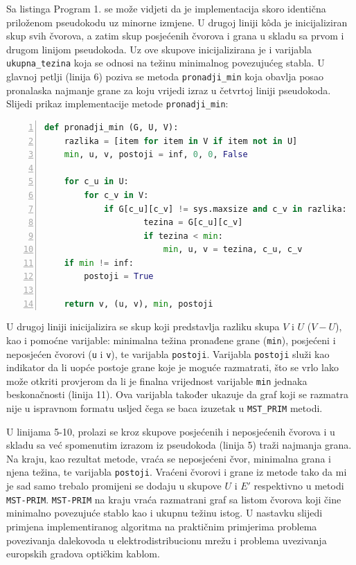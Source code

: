 \documentclass[conference]{IEEEtran}
\begin{document}
Sa listinga Program 1. se može vidjeti da je implementacija skoro identična priloženom pseudokodu uz minorne izmjene. U drugoj liniji kôda je inicijaliziran skup svih čvorova, a zatim skup posjećenih čvorova i grana u skladu sa prvom i drugom linijom pseudokoda. Uz ove skupove inicijalizirana je i varijabla \texttt{ukupna\_tezina} koja se odnosi na težinu minimalnog povezujućeg stabla. U glavnoj petlji (linija 6) poziva se metoda \texttt{pronadji\_min} koja obavlja posao pronalaska najmanje grane za koju vrijedi izraz u četvrtoj liniji pseudokoda. Slijedi prikaz implementacije metode \texttt{pronadji\_min}:


\begin{lstlisting}[frame=single,language=Python,numbers=left, numberstyle=\tiny, xleftmargin=0.02\textwidth, xrightmargin=0\textwidth, basicstyle=\ttfamily\small, caption=\texttt{pronadji\_min} metoda u Python-u]
def pronadji_min (G, U, V):
    razlika = [item for item in V if item not in U]
    min, u, v, postoji = inf, 0, 0, False

    for c_u in U:
        for c_v in V:
            if G[c_u][c_v] != sys.maxsize and c_v in razlika:
                    tezina = G[c_u][c_v]
                    if tezina < min:
                        min, u, v = tezina, c_u, c_v
    if min != inf:
        postoji = True

    return v, (u, v), min, postoji
\end{lstlisting}



U drugoj liniji inicijalizira se skup koji predstavlja razliku skupa $V$ i $U$ ($V - U$), kao i pomoćne varijable: minimalna težina pronađene grane (\texttt{min}), posjećeni i neposjećen čvorovi (\texttt{u} i \texttt{v}), te varijabla \texttt{postoji}. Varijabla \texttt{postoji} služi kao indikator da li uopće postoje grane koje je moguće razmatrati, što se vrlo lako može otkriti provjerom da li je finalna vrijednost varijable \texttt{min} jednaka beskonačnosti (linija 11). Ova varijabla također ukazuje da graf koji se razmatra nije u ispravnom formatu usljed čega se baca izuzetak u \texttt{MST\_PRIM} metodi.

U linijama 5-10, prolazi se kroz skupove posjećenih i neposjećenih čvorova i u skladu sa već spomenutim izrazom iz pseudokoda (linija 5) traži najmanja grana. Na kraju, kao rezultat metode, vraća se neposjećeni čvor, minimalna grana i njena težina, te varijabla \texttt{postoji}. Vraćeni čvorovi i grane iz metode tako da mi je sad samo trebalo promijeni se dodaju u skupove $U$ i $E'$ respektivno u metodi \texttt{MST-PRIM}. \texttt{MST-PRIM} na kraju vraća razmatrani graf sa listom čvorova koji čine minimalno povezujuće stablo kao i ukupnu težinu istog. U nastavku slijedi primjena implementiranog algoritma na praktičnim primjerima problema povezivanja dalekovoda u elektrodistribucionu mrežu i problema uvezivanja europskih gradova optičkim kablom.
\end{document}
